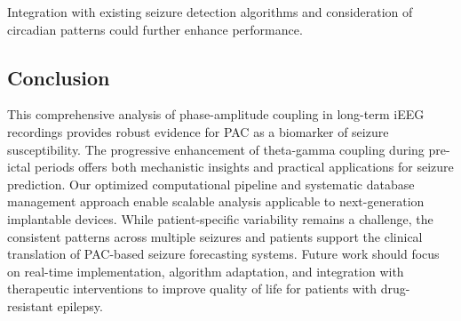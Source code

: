 Integration with existing seizure detection algorithms and consideration of circadian patterns could further enhance performance.

\subsection{Conclusion}
This comprehensive analysis of phase-amplitude coupling in long-term iEEG recordings provides robust evidence for PAC as a biomarker of seizure susceptibility. The progressive enhancement of theta-gamma coupling during pre-ictal periods offers both mechanistic insights and practical applications for seizure prediction. Our optimized computational pipeline and systematic database management approach enable scalable analysis applicable to next-generation implantable devices. While patient-specific variability remains a challenge, the consistent patterns across multiple seizures and patients support the clinical translation of PAC-based seizure forecasting systems. Future work should focus on real-time implementation, algorithm adaptation, and integration with therapeutic interventions to improve quality of life for patients with drug-resistant epilepsy.

\label{sec:discussion}
